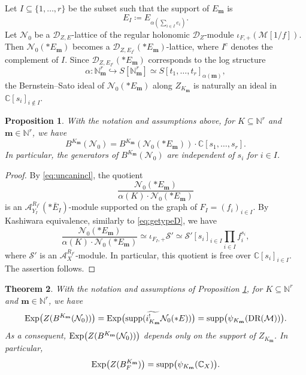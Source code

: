 \documentclass{amsart}
\theoremstyle{plain}
\newtheorem{theorem}{Theorem}
\numberwithin{theorem}{section}
\newtheorem{prop}[theorem]{Proposition}
\theoremstyle{definition}
\theoremstyle{remark}
\theoremstyle{definition}
\newcommand{\wt}{\widetilde}
\newcommand{\C}{\mathbb{C}} %
\newcommand{\N}{\mathbb{N}}
\newcommand{\cM}{\mathcal{M}}
\newcommand{\cN}{\mathcal{N}}
\newcommand{\cS}{\mathcal{S}}
\newcommand{\bm}{\mathbf{m}}
\newcommand{\sA}{\mathscr{A}}
\newcommand{\shD}{\mathscr{D}}
\newcommand{\DR}{\textup{DR}}
\newcommand{\supp}{\textup{supp}}
\newcommand{\Exp}{\textup{Exp}}
\begin{document}
Let $I\subseteq\{1,\dots,r\}$ be the subset such that the support of
$E_\bm$ is
\[
E_I
\coloneqq
E_{\alpha(\sum_{i\in I}e_i)}.
\]
Let $\cN_0$ be a $\shD_{Z,E}$-lattice of the regular holonomic $\shD_Z$-module
$\iota_{F,+}(\cM[1/f]).$
Then $\cN_0(*E_\bm)$ becomes a
$\shD_{Z,E_{I^c}}(*E_\bm)$-lattice, where $I^c$ denotes the complement of
$I$. Since $\shD_{Z,E_{I^c}}(*E_\bm)$ corresponds to the log structure
\[
\alpha\colon
\N^r_\bm
\hookrightarrow
S[\N^r_\bm]
\simeq
S[t_1,\dots,t_r]_{\alpha(\bm)},
\]
the Bernstein--Sato ideal of $\cN_0(*E_\bm)$ along $Z_{K_\bm}$ is naturally an
ideal in
$\C[s_i]_{i\notin I}.$

\begin{prop}\label{prop:localizeBF}
With the notation and assumptions above, for $K\subseteq \N^r$ and
$\bm\in \N^r$, we have
\[
B^{K_\bm}(\cN_0)
=
B^{K_\bm}(\cN_0(*E_\bm))\cdot \C[s_1,\dots,s_r].
\]
In particular, the generators of $B^{K_\bm}(\cN_0)$ are independent of
$s_i$ for $i\in I$.
\end{prop}

\begin{proof}
By \eqref{eq:uncanincl}, the quotient
\[
\frac{\cN_0(*E_\bm)}
{\alpha(K)\cdot \cN_0(*E_\bm)}
\]
is an
$\sA_{Y_I}^{R_{I^c}}(*\bar E_I)\text{-module}$
supported on the graph of
$F_I=(f_i)_{i\in I}.$
By Kashiwara equivalence, similarly to \eqref{eq:getypeD}, we have
\[
\frac{\cN_0(*E_\bm)}
{\alpha(K)\cdot \cN_0(*E_\bm)}
\simeq
\iota_{F_I,+}\cS'
\simeq
\cS'[s_i]_{i\in I}\prod_{i\in I}f_i^{s_i},
\]
where $\cS'$ is an $\sA_X^{R_{I^c}}$-module. In particular, this quotient is
free over $\C[s_i]_{i\in I}$. The assertion follows.
\end{proof}

\begin{theorem}\label{thm:expofBF}
With the notation and assumptions of Proposition \ref{prop:localizeBF}, for
$K\subseteq \N^r$ and $\bm\in \N^r$, we have
\[
\Exp\big(Z(B^{K_\bm}(\cN_0))\big)
=
\Exp\big(\supp(\wt{i^!_{K_\bm}}\cN_0(*E))\big)
=
\supp\big(\psi_{K_\bm}(\DR(\cM))\big).
\]
As a consequent,
$\Exp\big(Z(B^{K_\bm}(\cN_0))\big)$
depends only on the support of $Z_{K_\bm}$. In particular,
\[
\Exp\big(Z(B_F^{K_\bm})\big)
=
\supp\big(\psi_{K_\bm}(\C_X)\big).
\]
\end{theorem}
\end{document}
